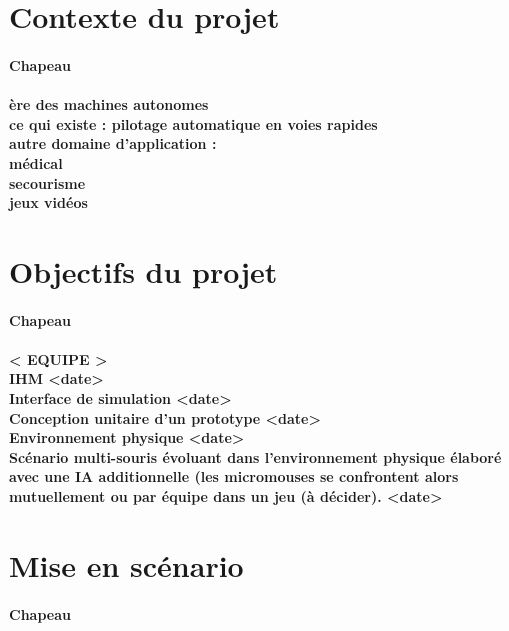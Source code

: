 \section{Contexte du projet}
\label{sec:introduction_contexte_du_projet}

\paragraph{Chapeau}
\paragraph{
ère des machines autonomes
\\ce qui existe : pilotage automatique en voies rapides
\\autre domaine d'application :
\\médical
\\secourisme
\\jeux vidéos
\\
}

\section{Objectifs du projet}
\label{sec:introduction_objectifs_du_projet}

\paragraph{Chapeau}
\paragraph{
< EQUIPE >
\\ IHM <date>
\\ Interface de simulation <date>
\\ Conception unitaire d'un prototype <date>
\\ Environnement physique <date>
\\ Scénario multi-souris évoluant dans l'environnement physique élaboré avec une IA additionnelle (les micromouses se confrontent alors mutuellement ou par équipe dans un jeu (à décider). <date>
}

\section{Mise en scénario}
\label{sec:introduction_mise_en_scenario}

\paragraph{Chapeau}
